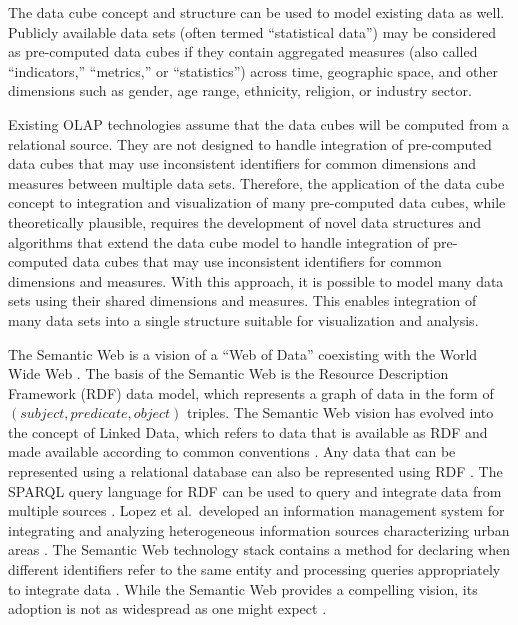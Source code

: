 The data cube concept and structure can be used to model existing data as well. Publicly available data sets (often termed ``statistical data'') may be considered as pre-computed data cubes if they contain aggregated measures (also called ``indicators,'' ``metrics,'' or ``statistics'') across time, geographic space, and other dimensions such as gender, age range, ethnicity, religion, or industry sector.

Existing OLAP technologies assume that the data cubes will be computed from a relational source. They are not designed to handle integration of pre-computed data cubes that may use inconsistent identifiers for common dimensions and measures between multiple data sets. Therefore, the application of the data cube concept to integration and visualization of many pre-computed data cubes, while theoretically plausible, requires the development of novel data structures and algorithms that extend the data cube model to handle integration of pre-computed data cubes that may use inconsistent identifiers for common dimensions and measures. With this approach, it is possible to model many data sets using their shared dimensions and measures. This enables integration of many data sets into a single structure suitable for visualization and analysis.

The Semantic Web is a vision of a ``Web of Data'' coexisting with the World Wide Web \cite{berners2001semantic}. The basis of the Semantic Web is the Resource Description Framework (RDF) data model, which represents a graph of data in the form of $(subject, predicate, object)$ triples. The Semantic Web vision has evolved into the concept of Linked Data, which refers to data that is available as RDF and made available according to common conventions \cite{bizer2009linked, bizer2007publish}. Any data that can be represented using a relational database can also be represented using RDF \cite{bizer2006d2r}. The SPARQL query language for RDF can be used to query and integrate data from multiple sources \cite{quilitz2008querying}. Lopez et al.\ developed an information management system for integrating and analyzing heterogeneous information sources characterizing urban areas \cite{lopez2012queriocity}. The Semantic Web technology stack contains a method for declaring when different identifiers refer to the same entity and processing queries appropriately to integrate data \cite{halpin2010owl, ding2010sameas}. While the Semantic Web provides a compelling vision, its adoption is not as widespread as one might expect \cite{lytras2008semantic}.

